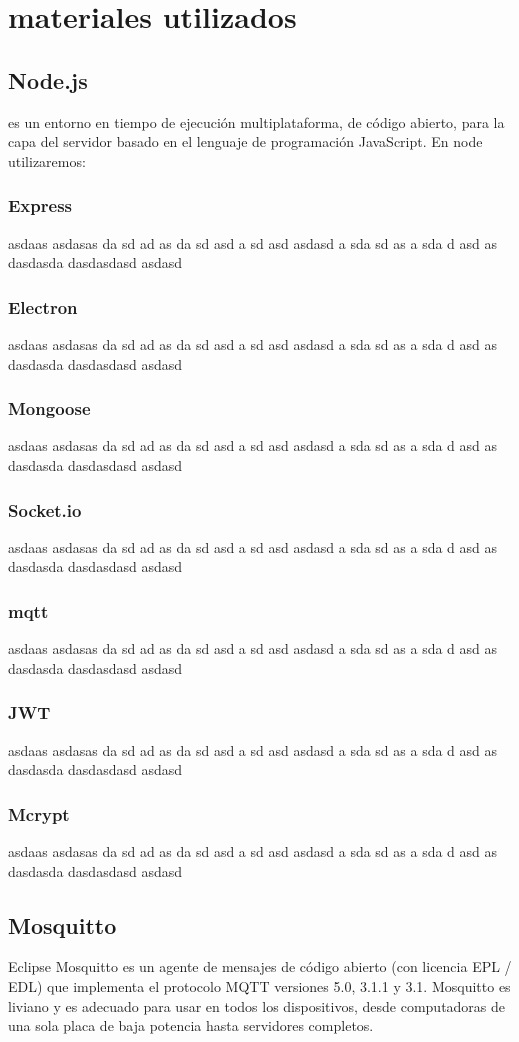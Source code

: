 \section{materiales utilizados}
\subsection{Node.js}
es un entorno en tiempo de ejecución multiplataforma, de código abierto, para la capa del servidor basado en el lenguaje de programación JavaScript.
En node utilizaremos:
\subsubsection{Express}
asdaas asdasas da sd ad as da sd asd a sd asd asdasd a sda sd as a sda d asd as dasdasda dasdasdasd asdasd
\subsubsection{Electron}
asdaas asdasas da sd ad as da sd asd a sd asd asdasd a sda sd as a sda d asd as dasdasda dasdasdasd asdasd
\subsubsection{Mongoose}
asdaas asdasas da sd ad as da sd asd a sd asd asdasd a sda sd as a sda d asd as dasdasda dasdasdasd asdasd
\subsubsection{Socket.io}
asdaas asdasas da sd ad as da sd asd a sd asd asdasd a sda sd as a sda d asd as dasdasda dasdasdasd asdasd
\subsubsection{mqtt}
asdaas asdasas da sd ad as da sd asd a sd asd asdasd a sda sd as a sda d asd as dasdasda dasdasdasd asdasd
\subsubsection{JWT}
asdaas asdasas da sd ad as da sd asd a sd asd asdasd a sda sd as a sda d asd as dasdasda dasdasdasd asdasd
\subsubsection{Mcrypt}
asdaas asdasas da sd ad as da sd asd a sd asd asdasd a sda sd as a sda d asd as dasdasda dasdasdasd asdasd
\subsection{Mosquitto}
Eclipse Mosquitto es un agente de mensajes de código abierto (con licencia EPL / EDL) que implementa el protocolo MQTT versiones 5.0, 3.1.1 y 3.1. Mosquitto es liviano y es adecuado para usar en todos los dispositivos, desde computadoras de una sola placa de baja potencia hasta servidores completos.
